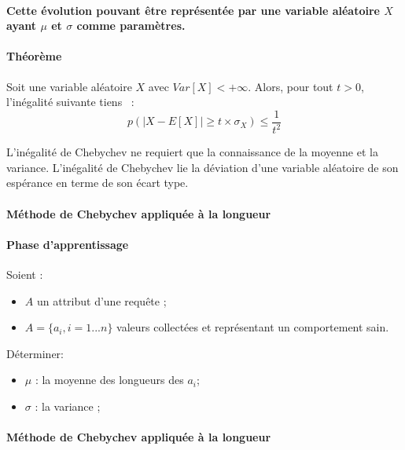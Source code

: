 \documentclass[a4paper,10pt,justified,openany]{tufte-book}
\begin{document}
 \paragraph{Cette évolution pouvant être représentée par une variable aléatoire $X$ ayant $\mu$ et $\sigma$ comme paramètres.}
 
 
 \paragraph{Théorème}
  Soit une variable aléatoire $X$ avec $Var[X] < +\infty$. Alors, pour tout $t > 0$, l'inégalité suivante tiens~\cite{mohri2012foundations} : 
    \begin{equation}
  p(|X - E[X]| \geq t \times \sigma_X) \leq \frac{1}{t^2}
 \end{equation}

 L'inégalité de Chebychev ne requiert que la connaissance de la moyenne et la variance. 
 L'inégalité de Chebychev lie la déviation d'une variable aléatoire de son espérance en terme de son écart type.

 
 
 \paragraph{Méthode de Chebychev appliquée à la longueur}
 \paragraph{Phase d'apprentissage}
  Soient : 
  \begin{itemize}
   \item $A$ un attribut d'une requête ;
   \item $A = \{a_i, i  = 1...n\}$ valeurs collectées et représentant un comportement sain. 
  \end{itemize}
   
   Déterminer: 
   \begin{itemize}
    \item $\mu$ : la moyenne des longueurs des $a_i$;
    \item $\sigma$ : la variance ;
   \end{itemize}

   
 



 \paragraph{Méthode de Chebychev appliquée à la longueur}
\end{document}

